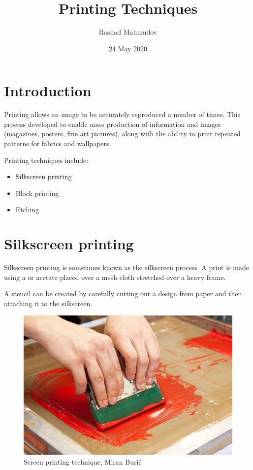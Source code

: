 \documentclass[a4paper,12pt]{article}
\title{Printing Techniques}
\author{Rashad Mahmudov}
\date{24 May 2020}
\begin{document}
\maketitle
\section{Introduction}
Printing allows an image to be accurately reproduced a number of times. This process developed to enable mass production of information and images (magazines, posters, fine art pictures), along with the ability to print repeated patterns for fabrics and wallpapers.


Printing techniques include:
\begin{itemize}
\item{Silkscreen printing}
\item{Block printing}
\item{Etching}
\end{itemize}

\section{Silkscreen printing}


Silkscreen printing is sometimes known as the silkscreen process. A print is made using a or acetate placed over a mesh cloth stretched over a heavy frame.

A stencil can be created by carefully cutting out a design from paper and then attaching it to the silkscreen.

\begin{figure}
    \centering
    \includegraphics[scale=.7]{img/pic01.jpg}
    \caption{Screen printing technique, Miran Burić}
\end{figure}
\end{document}
